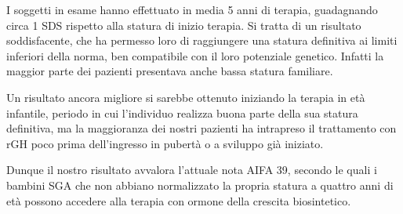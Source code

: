 \documentclass[12pt,a4paper]{article}
\begin{document}
I soggetti in esame hanno effettuato in media 5 anni di terapia, guadagnando circa 1 SDS rispetto alla statura di inizio terapia. Si tratta di un risultato soddisfacente, che ha permesso loro di raggiungere una statura definitiva ai limiti inferiori della norma, ben compatibile con il loro potenziale genetico. Infatti la maggior parte dei pazienti presentava anche bassa statura familiare. 

Un risultato ancora migliore si sarebbe ottenuto iniziando la terapia in età infantile, periodo in cui l'individuo realizza buona parte della sua statura definitiva, ma la maggioranza dei nostri pazienti ha intrapreso il trattamento con rGH poco prima dell'ingresso in pubertà o a sviluppo già iniziato.

Dunque il nostro risultato avvalora l'attuale nota AIFA 39, secondo le quali i bambini SGA che non abbiano normalizzato la propria statura a quattro anni di età possono accedere alla terapia con ormone della crescita biosintetico.  



 
\end{document}

